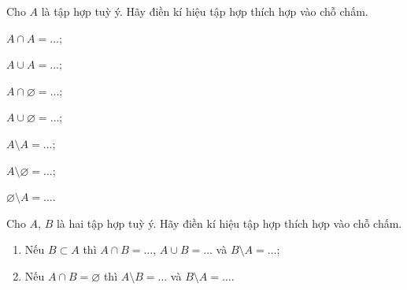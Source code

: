\begin{bt}%
	Cho $A$ là tập hợp tuỳ ý. Hãy điền kí hiệu tập hợp thích hợp vào chỗ chấm.
	\begin{listEX}[3]
		\item $A \cap A=\ldots$;
		\item $A \cup A=\ldots$;
		\item $A \cap \varnothing =\ldots$;
		\item $A \cup \varnothing =\ldots$;
		\item $A \setminus A=\ldots$;
		\item $A \setminus \varnothing =\ldots$;
		\item $\varnothing \setminus A=\ldots$.
	\end{listEX}
\end{bt}

\begin{bt}%
	Cho $A$, $B$ là hai tập hợp tuỳ ý. Hãy điền kí hiệu tập hợp thích hợp vào chỗ chấm.
	\begin{enumerate}
		\item Nếu $B \subset A$ thì $A \cap B=\ldots$, $A \cup B=\ldots$ và $B \setminus A=\ldots$;
		\item Nếu $A \cap B=\varnothing$ thì $A \setminus B=\ldots$ và $B \setminus A=\ldots$.
	\end{enumerate}
\end{bt}

